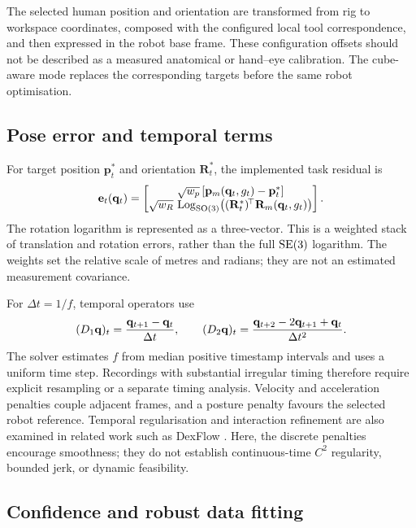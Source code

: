 The selected human position and orientation are transformed from rig to
workspace coordinates, composed with the configured local tool
correspondence, and then expressed in the robot base frame. These
configuration offsets should not be described as a measured anatomical
or hand--eye calibration. The cube-aware mode replaces the corresponding
targets before the same robot optimisation.

\subsection{Pose error and temporal terms}

For target position $\mathbf p_t^*$ and orientation $\mathbf R_t^*$,
the implemented task residual is
\begin{equation}
  \mathbf{e}_t(\mathbf{q}_t)=
  \begin{bmatrix}
    \sqrt{w_p}\,[\mathbf p_m(\mathbf{q}_t,g_t)-\mathbf p_t^*]\\
    \sqrt{w_R}\,\operatorname{Log}_{\mathrm{SO}(3)}
       \!\left((\mathbf R_t^*)^{\!\top}\mathbf R_m(\mathbf{q}_t,g_t)\right)
  \end{bmatrix}.
  \label{eq:residual}
\end{equation}
The rotation logarithm is represented as a three-vector. This is a
weighted stack of translation and rotation errors, rather than the full
$\mathrm{SE}(3)$ logarithm. The weights set the relative scale of metres and radians;
they are not an estimated measurement covariance.

For $\Delta t=1/f$, temporal operators use
\begin{equation}
  (D_1\mathbf{q})_t=\frac{\mathbf{q}_{t+1}-\mathbf{q}_t}{\Delta t},\qquad
  (D_2\mathbf{q})_t=\frac{\mathbf{q}_{t+2}-2\mathbf{q}_{t+1}+\mathbf{q}_t}{\Delta t^2}.
\end{equation}
The solver estimates $f$ from median positive timestamp intervals and
uses a uniform time step. Recordings with substantial irregular timing
therefore require explicit resampling or a separate timing analysis.
Velocity and acceleration penalties couple adjacent frames, and a posture
penalty favours the selected robot reference. Temporal regularisation and
interaction refinement are also examined in related work such as DexFlow
\cite{dexflow}. Here, the discrete penalties encourage smoothness; they do
not establish continuous-time $C^2$ regularity, bounded jerk, or dynamic
feasibility.

\subsection{Confidence and robust data fitting}

